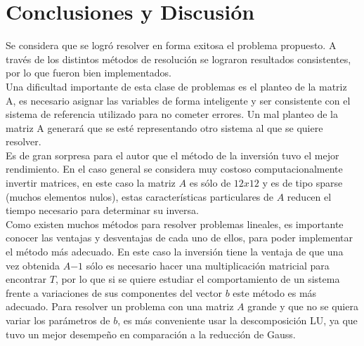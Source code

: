 \documentclass[a4paper, 11pt, spanish]{article}
\begin{document}
 
\section{Conclusiones y Discusi\'on}

Se considera que se logró resolver en forma exitosa el problema propuesto. A través de los distintos métodos de resolución se lograron resultados consistentes, por lo que fueron bien implementados.\\
Una dificultad importante de esta clase de problemas es el planteo de la matriz A, es necesario asignar las variables de forma inteligente y ser consistente con el sistema de referencia utilizado para no cometer errores. Un mal planteo de la matriz A generará que se esté representando otro sistema al que se quiere resolver.\\

Es de gran sorpresa para el autor que el método de la inversión tuvo el mejor rendimiento. En el caso general se considera muy costoso computacionalmente invertir matrices, en este caso la matriz $A$ es sólo de $12x12$ y es de tipo sparse (muchos elementos nulos), estas características particulares de $A$ reducen el tiempo necesario para determinar su inversa.\\

Como existen muchos métodos para resolver problemas lineales, es importante conocer las ventajas y desventajas de cada uno de ellos, para poder implementar el método más adecuado. En este caso la inversión tiene la ventaja de que una vez obtenida $A{-1}$ sólo es necesario hacer una multiplicación matricial para encontrar $T$, por lo que si se quiere estudiar el comportamiento de un sistema frente a variaciones de sus componentes del vector $b$ este método es más adecuado. Para resolver un problema con una matriz $A$ grande y que no se quiera variar los parámetros de $b$, es más conveniente usar la descomposición LU, ya que tuvo un mejor desempeño en comparación a la reducción de Gauss.
\end{document}
